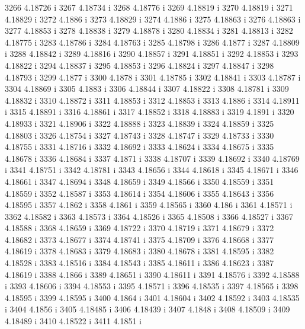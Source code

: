  3266  4.18726  i
 3267  4.18734  i
 3268  4.18776  i
 3269  4.18819  i
 3270  4.18819  i
 3271  4.18829  i
 3272  4.1886  i
 3273  4.18829  i
 3274  4.1886  i
 3275  4.18863  i
 3276  4.18863  i
 3277  4.18853  i
 3278  4.18838  i
 3279  4.18878  i
 3280  4.18834  i
 3281  4.18813  i
 3282  4.18775  i
 3283  4.18786  i
 3284  4.18763  i
 3285  4.18798  i
 3286  4.1877  i
 3287  4.18809  i
 3288  4.18842  i
 3289  4.18816  i
 3290  4.18857  i
 3291  4.18851  i
 3292  4.18853  i
 3293  4.18822  i
 3294  4.18837  i
 3295  4.18853  i
 3296  4.18824  i
 3297  4.18847  i
 3298  4.18793  i
 3299  4.1877  i
 3300  4.1878  i
 3301  4.18785  i
 3302  4.18841  i
 3303  4.18787  i
 3304  4.18869  i
 3305  4.1883  i
 3306  4.18844  i
 3307  4.18822  i
 3308  4.18781  i
 3309  4.18832  i
 3310  4.18872  i
 3311  4.18853  i
 3312  4.18853  i
 3313  4.1886  i
 3314  4.18911  i
 3315  4.18891  i
 3316  4.18861  i
 3317  4.18852  i
 3318  4.18883  i
 3319  4.1891  i
 3320  4.18933  i
 3321  4.18906  i
 3322  4.18888  i
 3323  4.18839  i
 3324  4.18859  i
 3325  4.18803  i
 3326  4.18754  i
 3327  4.18743  i
 3328  4.18747  i
 3329  4.18733  i
 3330  4.18755  i
 3331  4.18716  i
 3332  4.18692  i
 3333  4.18624  i
 3334  4.18675  i
 3335  4.18678  i
 3336  4.18684  i
 3337  4.1871  i
 3338  4.18707  i
 3339  4.18692  i
 3340  4.18769  i
 3341  4.18751  i
 3342  4.18781  i
 3343  4.18656  i
 3344  4.18618  i
 3345  4.18671  i
 3346  4.18661  i
 3347  4.18694  i
 3348  4.18659  i
 3349  4.18566  i
 3350  4.18559  i
 3351  4.18559  i
 3352  4.18587  i
 3353  4.18614  i
 3354  4.18606  i
 3355  4.18643  i
 3356  4.18595  i
 3357  4.1862  i
 3358  4.1861  i
 3359  4.18565  i
 3360  4.186  i
 3361  4.18571  i
 3362  4.18582  i
 3363  4.18573  i
 3364  4.18526  i
 3365  4.18508  i
 3366  4.18527  i
 3367  4.18588  i
 3368  4.18659  i
 3369  4.18722  i
 3370  4.18719  i
 3371  4.18679  i
 3372  4.18682  i
 3373  4.18677  i
 3374  4.18741  i
 3375  4.18709  i
 3376  4.18668  i
 3377  4.18619  i
 3378  4.18683  i
 3379  4.18683  i
 3380  4.18678  i
 3381  4.18595  i
 3382  4.18528  i
 3383  4.18516  i
 3384  4.18543  i
 3385  4.18611  i
 3386  4.18623  i
 3387  4.18619  i
 3388  4.1866  i
 3389  4.18651  i
 3390  4.18611  i
 3391  4.18576  i
 3392  4.18588  i
 3393  4.18606  i
 3394  4.18553  i
 3395  4.18571  i
 3396  4.18535  i
 3397  4.18565  i
 3398  4.18595  i
 3399  4.18595  i
 3400  4.1864  i
 3401  4.18604  i
 3402  4.18592  i
 3403  4.18535  i
 3404  4.1856  i
 3405  4.18485  i
 3406  4.18439  i
 3407  4.1848  i
 3408  4.18509  i
 3409  4.18489  i
 3410  4.18522  i
 3411  4.1851  i
